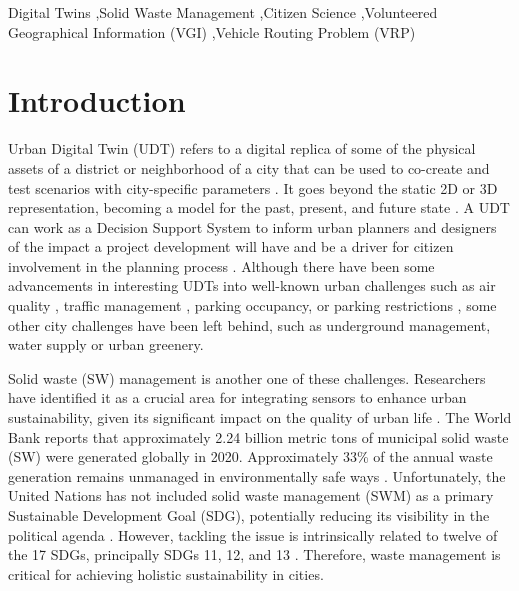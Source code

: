 \documentclass[authoryear,preprint,review,doubleblind, 12pt]{elsarticle}
\begin{document}
\begin{frontmatter}
    \begin{keyword}
    
    Digital Twins \sep Solid Waste Management \sep Citizen Science \sep Volunteered Geographical Information (VGI) \sep Vehicle Routing Problem (VRP)
    \end{keyword}   
    \end{frontmatter}


    \section{Introduction}
    \label{sec:Intro}
    Urban Digital Twin (UDT) refers to a digital replica of some of the physical assets of a district or neighborhood of a city that can be used to co-create and test scenarios with city-specific parameters \citep{Ruohomaki2018}. It goes beyond the static 2D or 3D representation, becoming a model for the past, present, and future state \citep{geohubDigitalTwinningUrban2022}.
    A UDT can work as a Decision Support System to inform urban planners and designers of the impact a project development will have and be a driver for citizen involvement in the planning process \citep{Dembski2019, Dembski2020}. Although there have been some advancements in interesting UDTs into well-known urban challenges such as air quality \citep{Mak2021}, traffic management \citep{Ibrahim2022}, parking occupancy, or parking restrictions \citep{latreCityThingsIntegrated2016}, some other city challenges have been left behind, such as underground management, water supply or urban greenery.

    Solid waste (SW) management is another one of these challenges. Researchers have identified it as a crucial area for integrating sensors to enhance urban sustainability, given its significant impact on the quality of urban life \citep{Ismagilova2019}. The World Bank \citep{Kaza2021} reports that approximately 2.24 billion metric tons of municipal solid waste (SW) were generated globally in 2020. Approximately 33\% of the annual waste generation remains unmanaged in environmentally safe ways \citep{Kaza2018}. Unfortunately, the United Nations has not included solid waste management (SWM) as a primary Sustainable Development Goal (SDG), potentially reducing its visibility in the political agenda \citep{rodicResolvingGovernanceIssues2017}. However, tackling the issue is intrinsically related to twelve of the 17 SDGs, principally SDGs 11, 12, and 13 \citep{Wilson2015}. Therefore, waste management is critical for achieving holistic sustainability in cities.
    
\end{document}
